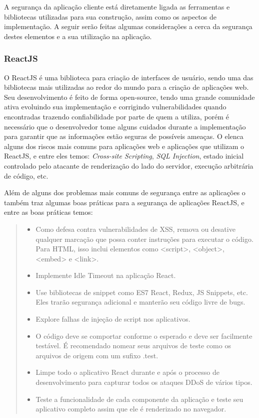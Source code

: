 A segurança da aplicação cliente está diretamente ligada as ferramentas e bibliotecas utilizadas para sua construção, assim como os aspectos de implementação. A seguir serão feitas algumas considerações a cerca da segurança destes elementos e a sua utilização na aplicação.

\subsubsection{ReactJS}

O ReactJS é uma biblioteca para criação de interfaces de usuário, sendo uma das bibliotecas mais utilizadas ao redor do mundo para a criação de aplicações web. Seu desenvolvimento é feito de forma open-source, tendo uma grande comunidade ativa evoluindo sua implementação e corrigindo vulnerabilidades quando encontradas trazendo confiabilidade por parte de quem a utiliza, porém é necessário que o desenvolvedor tome alguns cuidados durante a implementação para garantir que as informações estão seguras de possíveis ameaças. O \citeauthor{uppLabs_securityReactjs} elenca alguns dos riscos mais comuns para aplicações web e aplicações que utilizam o ReactJS, e entre eles temos: \textit{Cross-site Scripting}, \textit{SQL Injection}, estado inicial controlado pelo atacante de renderização do lado do servidor, execução arbitrária de código, etc.

Além de alguns dos problemas mais comuns de segurança entre as aplicações o \citeauthor{uppLabs_securityReactjs} também traz algumas boas práticas para a segurança de aplicações ReactJS, e entre as boas práticas temos:

    \begin{quote}
        \begin{itemize}
            \item Como defesa contra vulnerabilidades de XSS, remova ou desative qualquer marcação que possa conter instruções para executar o código. Para HTML, isso inclui elementos como <script>, <object>, <embed> e <link>.
            \item Implemente Idle Timeout na aplicação React.
             \item Use bibliotecas de snippet como ES7 React, Redux, JS Snippets, etc. Eles trarão segurança adicional e manterão seu código livre de bugs.
             \item Explore falhas de injeção de script nos aplicativos.
             \item O código deve se comportar conforme o esperado e deve ser facilmente testável. É recomendado nomear seus arquivos de teste como os arquivos de origem com um sufixo .test.
             \item Limpe todo o aplicativo React durante e após o processo de desenvolvimento para capturar todos os ataques DDoS de vários tipos.
             \item Teste a funcionalidade de cada componente da aplicação e teste seu aplicativo completo assim que ele é renderizado no navegador.
        \end{itemize}
    \end{quote}
    
